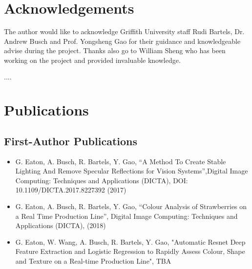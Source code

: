 \documentclass[fleqn,twoside]{article}
\begin{document}
\section*{Acknowledgements}


The author would like to acknowledge Griffith University staff Rudi Bartels, Dr. Andrew Busch and Prof. Yongsheng Gao for their guidance and knowledgeable advise during the project. Thanks also go to William Sheng who has been working on the project and provided invaluable knowledge.

....

\vspace*{\fill}%



\newpage

\section*{Publications}


\subsection{First-Author Publications}

\begin{itemize}
	\item{G. Eaton, A. Busch, R. Bartels, Y. Gao, “A Method To Create Stable Lighting And Remove Specular Reflections for Vision Systems”,Digital Image Computing: Techniques and Applications (DICTA), DOI: 10.1109/DICTA.2017.8227392 (2017)}
	\item{G. Eaton, A. Busch, R. Bartels, Y. Gao, “Colour Analysis of Strawberries on a Real Time Production Line”, Digital Image Computing: Techniques and Applications (DICTA), (2018)}
	\item{G. Eaton, W. Wang, A. Busch, R. Bartels, Y. Gao, "Automatic Resnet Deep Feature Extraction and Logistic Regression to Rapidly Assess Colour, Shape and Texture on a Real-time Production Line", TBA}
\end{itemize}  
\end{document}
